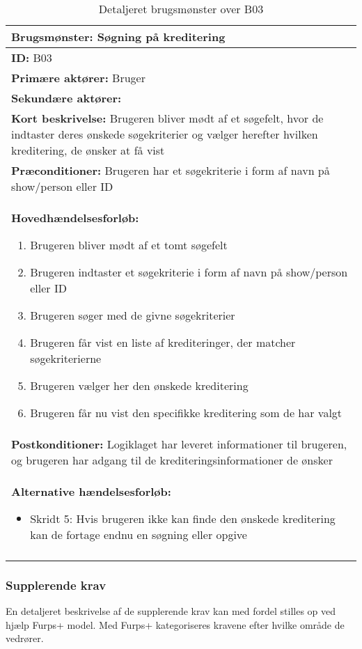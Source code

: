 \begin{longtable}{|p{150mm}|}
\hline
\textbf{Brugsmønster:} Søgning på kreditering\\ \hline
\textbf{ID:} B03         \\ \hline
\textbf{Primære aktører:} Bruger          \\ \hline
\textbf{Sekundære aktører:}        \\ \hline
\textbf{Kort beskrivelse:} Brugeren bliver mødt af et søgefelt, hvor de indtaster deres ønskede søgekriterier og vælger herefter hvilken kreditering, de ønsker at få vist         \\ \hline
\textbf{Præconditioner:} Brugeren har et søgekriterie i form af navn på show/person eller ID        \\ \hline
\textbf{Hovedhændelsesforløb:}
    \begin{enumerate}
    \setlength{\itemsep}{0pt}
        \item Brugeren bliver mødt af et tomt søgefelt
        \item Brugeren indtaster et søgekriterie i form af navn på show/person eller ID
        \item Brugeren søger med de givne søgekriterier
        \item Brugeren får vist en liste af krediteringer, der matcher søgekriterierne
        \item Brugeren vælger her den ønskede kreditering 
        \item Brugeren får nu vist den specifikke kreditering som de har valgt
    \end{enumerate}
\\ \hline
\textbf{Postkonditioner:} Logiklaget har leveret informationer til brugeren, og brugeren har adgang til de krediteringsinformationer de ønsker         \\ \hline
\textbf{Alternative hændelsesforløb:}
\begin{itemize}
    \item Skridt 5: Hvis brugeren ikke kan finde den ønskede kreditering kan de fortage endnu en søgning eller opgive
\end{itemize}\\ \hline
    \caption{Detaljeret brugsmønster over B03}
    \label{tab:Detaljeret_brugsmønsterdiagram_B01}

\end{longtable}

\subsubsection{Supplerende krav}
\label{supplerende_krav_txt}
En detaljeret beskrivelse af de supplerende krav kan med fordel stilles op ved hjælp Furps+ model. Med Furps+ kategoriseres kravene efter hvilke område de vedrører. 



